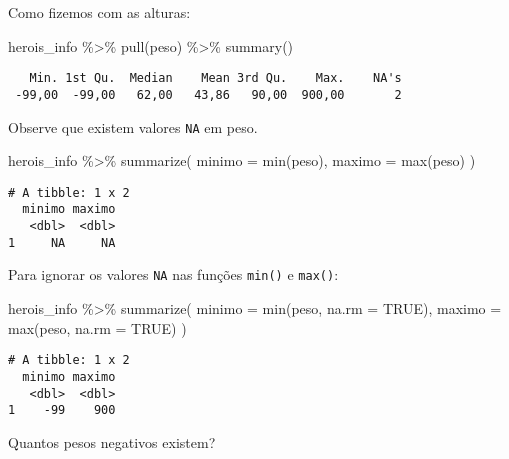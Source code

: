 \documentclass[
  letterpaper,
  DIV=11,
  numbers=noendperiod]{scrreprt}
\newenvironment{Shaded}{\begin{snugshade}}{\end{snugshade}}
\newcommand{\AttributeTok}[1]{\textcolor[rgb]{0.40,0.45,0.13}{#1}}
\newcommand{\ConstantTok}[1]{\textcolor[rgb]{0.56,0.35,0.01}{#1}}
\newcommand{\FunctionTok}[1]{\textcolor[rgb]{0.28,0.35,0.67}{#1}}
\newcommand{\NormalTok}[1]{\textcolor[rgb]{0.00,0.23,0.31}{#1}}
\newcommand{\SpecialCharTok}[1]{\textcolor[rgb]{0.37,0.37,0.37}{#1}}
\begin{document}
\begin{enumerate}
\begin{tcolorbox}
  Como fizemos com as alturas:

\begin{Shaded}
\begin{Highlighting}[]
\NormalTok{herois\_info }\SpecialCharTok{\%\textgreater{}\%} 
  \FunctionTok{pull}\NormalTok{(peso) }\SpecialCharTok{\%\textgreater{}\%} 
  \FunctionTok{summary}\NormalTok{()}
\end{Highlighting}
\end{Shaded}

\begin{verbatim}
   Min. 1st Qu.  Median    Mean 3rd Qu.    Max.    NA's 
 -99,00  -99,00   62,00   43,86   90,00  900,00       2 
\end{verbatim}

  Observe que existem valores \texttt{NA} em peso.

\begin{Shaded}
\begin{Highlighting}[]
\NormalTok{herois\_info }\SpecialCharTok{\%\textgreater{}\%} 
  \FunctionTok{summarize}\NormalTok{(}
    \AttributeTok{minimo =} \FunctionTok{min}\NormalTok{(peso),}
    \AttributeTok{maximo =} \FunctionTok{max}\NormalTok{(peso)}
\NormalTok{  )}
\end{Highlighting}
\end{Shaded}

\begin{verbatim}
# A tibble: 1 x 2
  minimo maximo
   <dbl>  <dbl>
1     NA     NA
\end{verbatim}

  Para ignorar os valores \texttt{NA} nas funções \texttt{min()} e
  \texttt{max()}:

\begin{Shaded}
\begin{Highlighting}[]
\NormalTok{herois\_info }\SpecialCharTok{\%\textgreater{}\%} 
  \FunctionTok{summarize}\NormalTok{(}
    \AttributeTok{minimo =} \FunctionTok{min}\NormalTok{(peso, }\AttributeTok{na.rm =} \ConstantTok{TRUE}\NormalTok{),}
    \AttributeTok{maximo =} \FunctionTok{max}\NormalTok{(peso, }\AttributeTok{na.rm =} \ConstantTok{TRUE}\NormalTok{)}
\NormalTok{  )}
\end{Highlighting}
\end{Shaded}

\begin{verbatim}
# A tibble: 1 x 2
  minimo maximo
   <dbl>  <dbl>
1    -99    900
\end{verbatim}

  Quantos pesos negativos existem?


\end{tcolorbox}
\end{enumerate}
\end{document}
